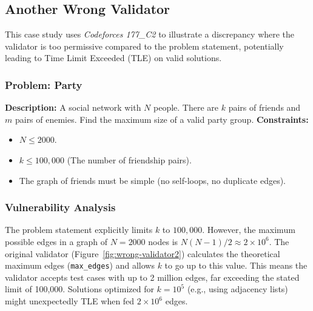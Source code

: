 \documentclass[11pt]{article}
\begin{document}
\subsection{Another Wrong Validator}
This case study uses \textit{Codeforces 177\_C2} to illustrate a discrepancy where the validator is too permissive compared to the problem statement, potentially leading to Time Limit Exceeded (TLE) on valid solutions.

\subsubsection{Problem: Party}
\textbf{Description:} A social network with $N$ people. There are $k$ pairs of friends and $m$ pairs of enemies. Find the maximum size of a valid party group.
\newline
\textbf{Constraints:}
\begin{itemize}
    \item $N \le 2000$.
    \item $k \le 100,000$ (The number of friendship pairs).
    \item The graph of friends must be simple (no self-loops, no duplicate edges).
\end{itemize}

\subsubsection{Vulnerability Analysis}
The problem statement explicitly limits $k$ to $100,000$. However, the maximum possible edges in a graph of $N=2000$ nodes is $N(N-1)/2 \approx 2 \times 10^6$.
The original validator (Figure~\ref{fig:wrong-validator2}) calculates the theoretical maximum edges (\texttt{max\_edges}) and allows $k$ to go up to this value.
This means the validator accepts test cases with up to 2 million edges, far exceeding the stated limit of 100,000. Solutions optimized for $k=10^5$ (e.g., using adjacency lists) might unexpectedly TLE when fed $2 \times 10^6$ edges.
\end{document}
